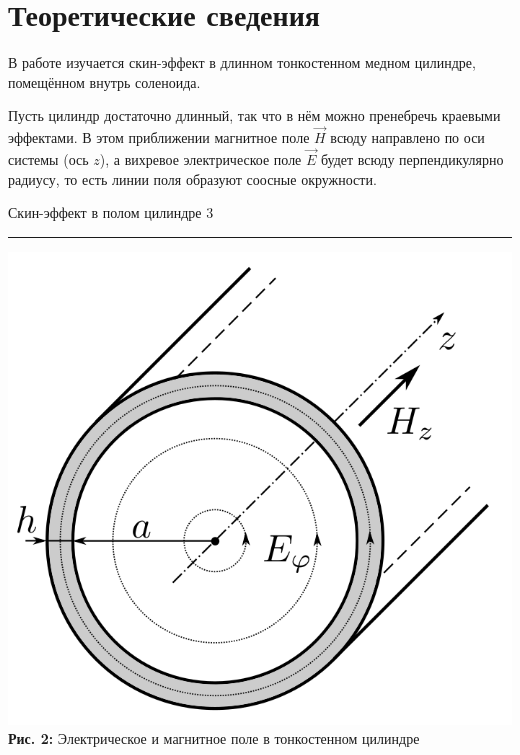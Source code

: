 \documentclass[12pt,a4paper]{scrartcl}
\begin{document}
	\section{Теоретические сведения}
	
	В работе изучается скин-эффект в длинном тонкостенном медном цилиндре, помещённом внутрь соленоида.
	
	Пусть цилиндр достаточно длинный, так что в нём можно пренебречь краевыми эффектами. В этом приближении магнитное поле $\vec{H}$ всюду направлено по оси системы (ось $z$), а вихревое электрическое поле $\vec{E}$ будет всюду перпендикулярно радиусу, то есть линии поля образуют соосные окружности. 
	
	
	\newpage
	
	
	\begin{flushleft}
		\footnotesize{Скин-эффект в полом цилиндре} \hspace{\fill} \footnotesize{3}
		\\[-0.3cm]\noindent\rule{\textwidth}{0.3pt}
	\end{flushleft}
	
	\begin{center}
		\includegraphics[scale=0.3]{PIC_2.png}
		\\\textbf{Рис. 2:} Электрическое и магнитное поле в тонкостенном цилиндре
	\end{center}
	
\end{document}
